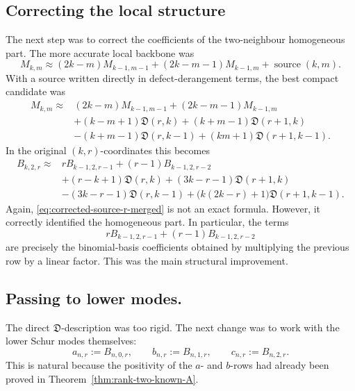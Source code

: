 \documentclass[11pt]{amsart}
\numberwithin{equation}{section}
\theoremstyle{remark}
\newcommand{\Dder}{\mathfrak D}
\begin{document}
\subsection{Correcting the local structure}
The next step was to correct the coefficients of the two-neighbour
homogeneous part.  The more accurate local backbone was
\begin{equation}\label{eq:corrected-backbone-merged}
  M_{k,m}
  \approx
  (2k-m)M_{k-1,m-1}
  +(2k-m-1)M_{k-1,m}
  +\operatorname{source}(k,m).
\end{equation}
With a source written directly in defect-derangement terms, the best compact
candidate was
\begin{equation}\label{eq:corrected-source-merged}
\begin{aligned}
M_{k,m} \approx {}&
(2k-m)M_{k-1,m-1}
+(2k-m-1)M_{k-1,m}  \\
&+(k-m+1)\Dder(r,k)
+(k+m-1)\Dder(r+1,k)  \\
&-(k+m-1)\Dder(r,k-1)
+(km+1)\Dder(r+1,k-1).
\end{aligned}
\end{equation}
In the original $(k,r)$-coordinates this becomes
\begin{equation}\label{eq:corrected-source-r-merged}
\begin{aligned}
B_{k,2,r}\approx{}&
rB_{k-1,2,r-1}
+(r-1)B_{k-1,2,r-2}  \\
&+(r-k+1)\Dder(r,k)
+(3k-r-1)\Dder(r+1,k)  \\
&-(3k-r-1)\Dder(r,k-1)
+\bigl(k(2k-r)+1\bigr)\Dder(r+1,k-1).
\end{aligned}
\end{equation}
Again, \eqref{eq:corrected-source-r-merged} is not an exact formula.
However, it correctly identified the homogeneous part.  In particular, the
terms
\[
  rB_{k-1,2,r-1}
  +(r-1)B_{k-1,2,r-2}
\]
are precisely the binomial-basis coefficients obtained by multiplying the
previous row by a linear factor.  This was the main structural improvement.

\subsection{Passing to lower modes.}
The direct $\Dder$-description was too rigid.  The next change was to
work with the lower Schur modes themselves:
\[
  a_{n,r}:=B_{n,0,r},\qquad
  b_{n,r}:=B_{n,1,r},\qquad
  c_{n,r}:=B_{n,2,r}.
\]
This is natural because the positivity of the $a$- and $b$-rows had
already been proved in Theorem~\ref{thm:rank-two-known-A}.
\end{document}
